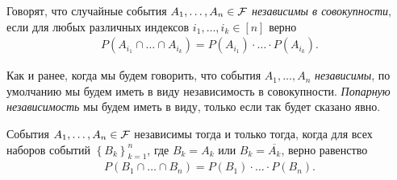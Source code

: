 \documentclass[../main.tex]{subfiles}
\begin{document}
\begin{df}
 Говорят, что случайные события $A_1, \ldots, A_n \in \mathcal F$ \textit{независимы в совокупности}, если для любых различных индексов $i_1, \ldots, i_k \in [n]$ верно
 \begin{align*}
  P(A_{i_1}\cap \ldots \cap A_{i_k}) = P(A_{i_1}) \cdot \ldots \cdot P(A_{i_k}).
 \end{align*} 
\end{df}
\begin{conventn*}
 Как и ранее, когда мы будем говорить, что события $A_1, \ldots, A_n$ \textit{независимы}, по умолчанию мы будем иметь в виду независимость в совокупности. \textit{Попарную независимость} мы будем иметь в виду, только если так будет сказано явно.
\end{conventn*}
\begin{remrk}
 \label{remark:independed_complement}
 События $A_1, \ldots, A_n \in \mathcal F$ независимы тогда и только тогда, когда для всех наборов событий $\left\{ B_k \right\}_{k=1}^{n}$, где $B_k = A_k$ или $B_k = \overline{A_k}$, верно равенство
 \begin{align}
  \label{equation:remark:independent_complement}
  P(B_1 \cap \ldots \cap B_n) = P(B_1) \cdot\ldots\cdot P(B_n).
 \end{align}
\end{remrk}
\end{document}
